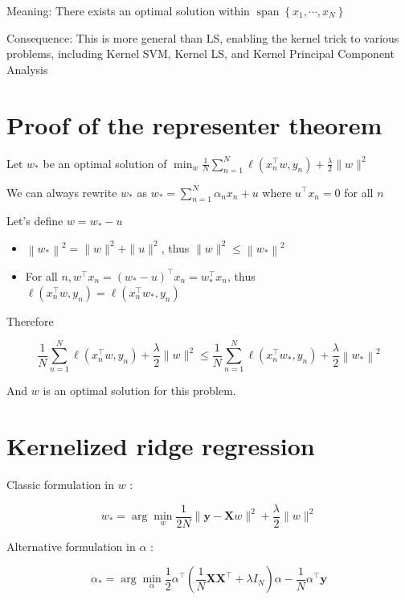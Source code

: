 \documentclass[10pt]{article}
\begin{document}
Meaning: There exists an optimal solution within $\operatorname{span}\left\{x_{1}, \cdots, x_{N}\right\}$

Consequence: This is more general than LS, enabling the kernel trick to various problems, including Kernel SVM, Kernel LS, and Kernel Principal Component Analysis

\section*{Proof of the representer theorem}
Let $w_{*}$ be an optimal solution of $\min _{w} \frac{1}{N} \sum_{n=1}^{N} \ell\left(x_{n}^{\top} w, y_{n}\right)+\frac{\lambda}{2}\|w\|^{2}$

We can always rewrite $w_{*}$ as $w_{*}=\sum_{n=1}^{N} \alpha_{n} x_{n}+u$ where $u^{\top} x_{n}=0$ for all $n$

Let's define $w=w_{*}-u$

\begin{itemize}
  \item $\left\|w_{*}\right\|^{2}=\|w\|^{2}+\|u\|^{2}$, thus $\|w\|^{2} \leq\left\|w_{*}\right\|^{2}$

  \item For all $n, w^{\top} x_{n}=\left(w_{*}-u\right)^{\top} x_{n}=w_{*}^{\top} x_{n}$, thus $\ell\left(x_{n}^{\top} w, y_{n}\right)=\ell\left(x_{n}^{\top} w_{*}, y_{n}\right)$

\end{itemize}

Therefore

$$
\frac{1}{N} \sum_{n=1}^{N} \ell\left(x_{n}^{\top} w, y_{n}\right)+\frac{\lambda}{2}\|w\|^{2} \leq \frac{1}{N} \sum_{n=1}^{N} \ell\left(x_{n}^{\top} w_{*}, y_{n}\right)+\frac{\lambda}{2}\left\|w_{*}\right\|^{2}
$$

And $w$ is an optimal solution for this problem.

\section*{Kernelized ridge regression}
Classic formulation in $w$ :

$$
w_{*}=\arg \min _{w} \frac{1}{2 N}\|\mathbf{y}-\mathbf{X} w\|^{2}+\frac{\lambda}{2}\|w\|^{2}
$$

Alternative formulation in $\alpha$ :

$$
\alpha_{*}=\arg \min _{\alpha} \frac{1}{2} \alpha^{\top}\left(\frac{1}{N} \mathbf{X} \mathbf{X}^{\top}+\lambda I_{N}\right) \alpha-\frac{1}{N} \alpha^{\top} \mathbf{y}
$$
\end{document}
